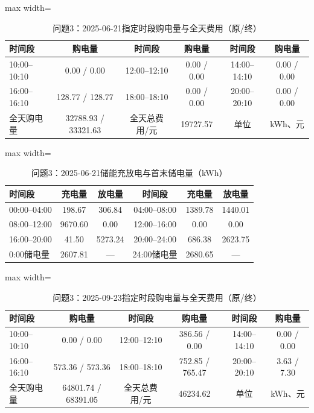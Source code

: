 \documentclass[UTF8,a4paper,zihao=-4,fontset=windows]{ctexart}
\begin{document}
\begin{table}[H]\centering\caption{问题3：2025-06-21指定时段购电量与全天费用（原/终）}
\fontsize{9.5}{12}\selectfont\setlength{\tabcolsep}{4pt}\renewcommand{\arraystretch}{1.12}
\begin{adjustbox}{max width=\linewidth}\begin{tabular}{lccccc}\toprule
时间段 & 购电量 & 时间段 & 购电量 & 时间段 & 购电量\\\midrule
10:00–10:10 & 0.00 / 0.00 & 12:00–12:10 & 0.00 / 0.00 & 14:00–14:10 & 0.00 / 0.00\\
16:00–16:10 & 128.77 / 128.77 & 18:00–18:10 & 0.00 / 0.00 & 20:00–20:10 & 0.00 / 0.00\\
全天购电量 & 32788.93 / 33321.63 & 全天总费用/元 & 19727.57 & 单位 & kWh、元\\
\bottomrule\end{tabular}\end{adjustbox}\end{table}
\begin{table}[H]\centering\caption{问题3：2025-06-21储能充放电与首末储电量（kWh）}
\fontsize{9.5}{12}\selectfont\setlength{\tabcolsep}{4pt}\renewcommand{\arraystretch}{1.12}
\begin{adjustbox}{max width=\linewidth}\begin{tabular}{lccccc}\toprule
时间段 & 充电量 & 放电量 & 时间段 & 充电量 & 放电量\\\midrule
00:00–04:00 & 198.67 & 306.84 & 04:00–08:00 & 1389.78 & 1440.01\\
08:00–12:00 & 9670.60 & 0.00 & 12:00–16:00 & 0.00 & 0.00\\
16:00–20:00 & 41.50 & 5273.24 & 20:00–24:00 & 686.38 & 2623.75\\
0:00储电量 & 2607.81 & — & 24:00储电量 & 2680.65 & —\\
\bottomrule\end{tabular}\end{adjustbox}\end{table}
\begin{table}[H]\centering\caption{问题3：2025-09-23指定时段购电量与全天费用（原/终）}
\fontsize{9.5}{12}\selectfont\setlength{\tabcolsep}{4pt}\renewcommand{\arraystretch}{1.12}
\begin{adjustbox}{max width=\linewidth}\begin{tabular}{lccccc}\toprule
时间段 & 购电量 & 时间段 & 购电量 & 时间段 & 购电量\\\midrule
10:00–10:10 & 0.00 / 0.00 & 12:00–12:10 & 386.56 / 0.00 & 14:00–14:10 & 0.00 / 0.00\\
16:00–16:10 & 573.36 / 573.36 & 18:00–18:10 & 752.85 / 765.47 & 20:00–20:10 & 3.63 / 7.30\\
全天购电量 & 64801.74 / 68391.05 & 全天总费用/元 & 46234.62 & 单位 & kWh、元\\
\bottomrule\end{tabular}\end{adjustbox}\end{table}
\end{document}
